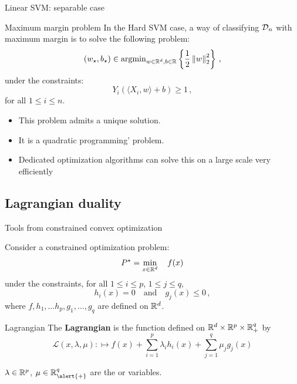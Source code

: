 \documentclass[xcolor={usenames,dvipsnames}]{beamer}
\begin{document}
\begin{frame}{Linear SVM: separable case}

\begin{block}{Maximum margin problem}
In the \alert{Hard SVM case}, a way of classifying ${\mathcal{D}}_n$ with maximum margin is to solve the following problem:
$$
(w_\star,b_\star)\in\mathrm{argmin}_{w \in \mathbb{R}^d, b \in \mathbb{R}}  \left\{\frac 12 \left\| w \right\|_2^2\right\}\,,
$$
under \alert{the constraints}:
$$ 
Y_i (\langle {X_i, w} \rangle  + b) \geq 1\,,
$$
for all $1\leq i\leq n$.
\end{block}

\medskip

\begin{itemize}
  \item This problem admits a \alert{unique} solution.
  \item It is a \alert{quadratic programming'} problem.
  \item Dedicated optimization algorithms can solve this on a large scale very efficiently
\end{itemize}
\end{frame}


\subsection{Lagrangian duality}
\begin{frame}{Tools from constrained convex optimization}

 Consider a \alert{constrained optimization problem}:
$$
   P^\star = \min_{x \in \mathbb{R}^d}  \quad f(x)
$$
under \alert{the constraints}, for all $1\leq i \leq p$, $1 \leq j \leq q$,
$$
 h_i(x) = 0 \quad\mathrm{and}\quad g_j(x) \leq 0\,,
$$
 where $f, h_1, \hdots h_p, g_1, \ldots, g_q$ are defined on $ \mathbb{R}^d$.

    
    \begin{block}{Lagrangian}
   The \textbf{Lagrangian} is the function defined on $\mathbb{R}^d \times \mathbb{R}^p\times \mathbb{R}_+^q$ by
  \begin{equation*}
    \mathcal{L}(x, \lambda, \mu): \mapsto f(x) + \sum_{i=1}^p \lambda_i h_i(x) + \sum_{j=1}^q \mu_j g_j(x)
  \end{equation*}
  \end{block}
    $\lambda  \in \mathbb{R}^p$,   $\mu \in \R_{\alert{+}}^q$ are the  or  variables.

\end{frame}
\end{document}
